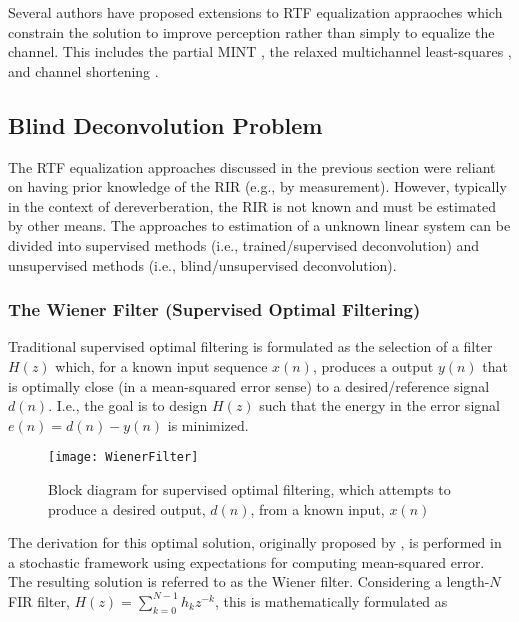Several authors have proposed extensions to RTF equalization appraoches which constrain the solution to improve perception rather than simply to equalize the channel. This includes the partial MINT \citep[i.e., PMINT][]{kodrasi2012robust}, the relaxed multichannel least-squares \citep{zhang2010use}, and channel shortening \citep{kallinger2006multi}.


\subsection{Blind Deconvolution Problem}

The RTF equalization approaches discussed in the previous section were reliant on having prior knowledge of the RIR (e.g., by measurement). However, typically in the context of dereverberation, the RIR is not known and must be estimated by other means. The approaches to estimation of a unknown linear system can be divided into supervised methods (i.e., trained/supervised deconvolution) and unsupervised methods (i.e., blind/unsupervised deconvolution).

\subsubsection{The Wiener Filter (Supervised Optimal Filtering)} \label{wiener_filter}

Traditional supervised optimal filtering is formulated as the selection of a filter $H(z)$ which, for a known input sequence $x(n)$, produces a output $y(n)$ that is optimally close (in a mean-squared error sense) to a desired/reference signal $d(n)$. I.e., the goal is to design $H(z)$ such that the energy in the error signal $e(n) = d(n)-y(n)$ is minimized. 

\begin{figure}[H]
	\texttt{[image: WienerFilter]}
	\centering
	\caption{Block diagram for supervised optimal filtering, which attempts to produce a desired output, $d(n)$, from a known input, $x(n)$}
	\label{fig:WienerFilterProblem}
\end{figure}

The derivation for this optimal solution, originally proposed by \cite{wiener1949extrapolation}, is performed in a stochastic framework using expectations for computing mean-squared error. The resulting solution is referred to as the Wiener filter. Considering a length-$N$ FIR filter, $H(z)=\sum_{k=0}^{N-1}h_k z^{-k}$, this is mathematically formulated as

